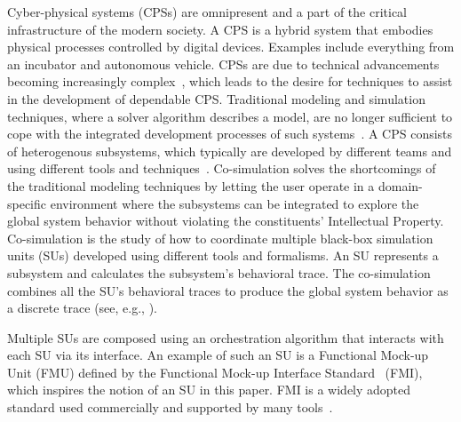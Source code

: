   

Cyber-physical systems (CPSs) are omnipresent and a part of the critical infrastructure of the modern society.
A CPS is a hybrid system that embodies physical processes controlled by digital devices. Examples include everything from an incubator and autonomous vehicle.
CPSs are due to technical advancements becoming increasingly complex~\cite{4519604}, which leads to the desire for techniques to assist in the development of dependable CPS.
Traditional modeling and simulation techniques, where a solver algorithm describes a model, are no longer sufficient to cope with the integrated development processes of such systems~\cite{FMI2014}.
A CPS consists of heterogenous subsystems, which typically are developed by different teams and using different tools and techniques~\cite{Monti_2021}. 
Co-simulation solves the shortcomings of the traditional modeling techniques by letting the user operate in a domain-speciﬁc environment where the subsystems can be integrated to explore the global system behavior without violating the constituents' Intellectual Property\cite{Gomes2018}. 
Co-simulation is the study of how to coordinate multiple black-box simulation units (SUs) developed using different tools and formalisms.
An SU represents a subsystem and calculates the subsystem's behavioral trace.
The co-simulation combines all the SU's behavioral traces to produce the global system behavior as a discrete trace (see, e.g., \cite{Kubler2000}).

Multiple SUs are composed using an orchestration algorithm that interacts with each SU via its interface.
An example of such an SU is a Functional Mock-up Unit (FMU) defined by the Functional Mock-up Interface Standard~\cite{FMI2014} (FMI), which inspires the notion of an SU in this paper. 
FMI is a widely adopted standard used commercially and supported by many tools~\cite{Tools_FMI}.

